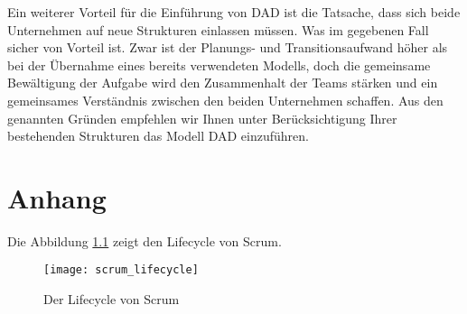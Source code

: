 Ein weiterer Vorteil für die Einführung von DAD ist die Tatsache, dass sich beide Unternehmen auf neue Strukturen einlassen müssen. Was im gegebenen Fall sicher von Vorteil ist. Zwar ist der Planungs- und Transitionsaufwand höher als bei der Übernahme eines bereits verwendeten Modells, doch die gemeinsame Bewältigung der Aufgabe wird den Zusammenhalt der Teams stärken und ein gemeinsames Verständnis zwischen den beiden Unternehmen schaffen. Aus den genannten Gründen empfehlen wir Ihnen unter Berücksichtigung Ihrer bestehenden Strukturen das Modell DAD einzuführen.

\chapter{Anhang}

Die Abbildung \ref{fig:scrum_lifecycle} zeigt den Lifecycle von Scrum.

\begin{figure}[H]
	\centering
	\texttt{[image: scrum\_lifecycle]}
	\caption{Der Lifecycle von Scrum \cite{agileLifecycle}}
	\label{fig:scrum_lifecycle}
\end{figure}


	